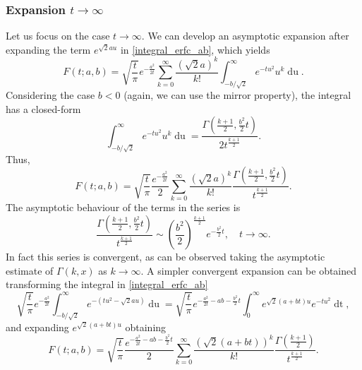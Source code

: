 \documentclass[10pt,a4paper,oneside]{article}
\numberwithin{equation}{section}
\begin{document}
\begin{appendices}
\subsubsection{Expansion $t \to \infty$}

Let us focus on the case $t \to \infty$. We can develop an asymptotic expansion after expanding the term $e^{\sqrt{2}au}$ in \eqref{integral_erfc_ab}, which yields
\begin{equation*}
F(t; a, b) = \sqrt{\frac{t}{\pi}} e^{-\frac{a^2}{2t}} \sum_{k=0}^{\infty}\frac{(\sqrt{2}a)^k}{k!}\int_{-b/\sqrt{2}}^{\infty} e^{-t u^2} u^k \mathop{du}.
\end{equation*}
Considering the case $b < 0$ (again, we can use the mirror property), the integral has a closed-form
\begin{equation*}
\int_{-b/\sqrt{2}}^{\infty} e^{-t u^2} u^k \mathop{du} = \frac{\Gamma\left(\frac{k+1}{2}, \frac{b^2}{2}t\right)}{2 t^{\frac{k+1}{2}}}.
\end{equation*}
Thus,
\begin{equation}\label{phi_expansion_incgamma}
F(t; a, b) = \sqrt{\frac{t}{\pi}} \frac{e^{-\frac{a^2}{2t}}}{2}  \sum_{k=0}^{\infty}\frac{(\sqrt{2}a)^k}{k!} \frac{\Gamma\left(\frac{k+1}{2}, \frac{b^2}{2}t\right)}{t^{\frac{k+1}{2}}}.
\end{equation}
The asymptotic behaviour of the terms in the series is
\begin{equation*}
\frac{\Gamma\left(\frac{k+1}{2}, \frac{b^2}{2}t\right)}{t^{\frac{k+1}{2}}} \sim \left(\frac{b^2}{2}\right)^{\frac{k+1}{2}} e^{-\frac{b^2}{2} t}, \quad t\to\infty.
\end{equation*}
In fact this series is convergent, as can be observed taking the asymptotic estimate of $\Gamma(k, x)$ as $k \to \infty$. A simpler convergent expansion can be obtained transforming the integral in \eqref{integral_erfc_ab}
\begin{equation*}
\sqrt{\frac{t}{\pi}} e^{-\frac{a^2}{2t}} \int_{-b/\sqrt{2}}^{\infty} e^{-(tu^2 - \sqrt{2}au)} \mathop{du} = \sqrt{\frac{t}{\pi}} e^{-\frac{a^2}{2t} -ab - \frac{b^2}{2}t}\int_0^{\infty}e^{\sqrt{2}(a+bt)u} e^{-tu^2}\mathop{dt},
\end{equation*}
and expanding $e^{\sqrt{2}(a+bt)u}$ obtaining
\begin{equation}
F(t; a, b) = \sqrt{\frac{t}{\pi}} \frac{e^{-\frac{a^2}{2t} -ab - \frac{b^2}{2}t}}{2} \sum_{k=0}^{\infty} \frac{(\sqrt{2}(a+bt))^k}{k!}\frac{\Gamma\left(\frac{k+1}{2}\right)}{t^{\frac{k+1}{2}}}.
\end{equation}


\end{appendices}
\end{document}
